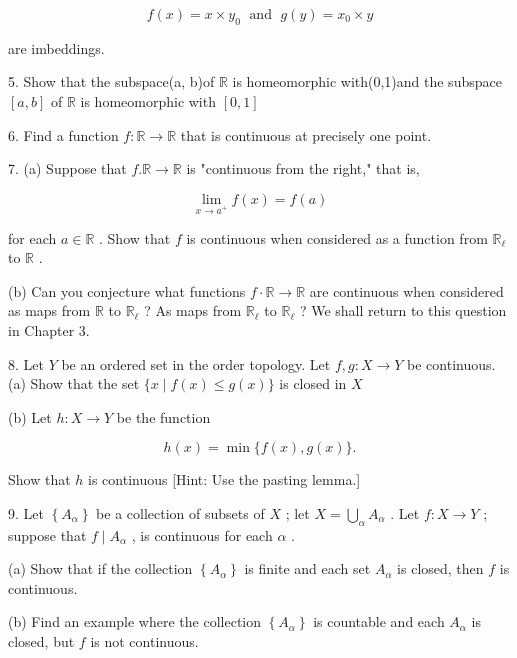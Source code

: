 \[
f\left( x\right)  = x \times  {y}_{0}\;\text{ and }\;g\left( y\right)  = {x}_{0} \times  y
\]

are imbeddings.

5. Show that the subspace(a, b)of \(\mathbb{R}\) is homeomorphic with(0,1)and the subspace \(\left\lbrack  {a,b}\right\rbrack\) of \(\mathbb{R}\) is homeomorphic with \(\left\lbrack  {0,1}\right\rbrack\)

6. Find a function \(f : \mathbb{R} \rightarrow  \mathbb{R}\) that is continuous at precisely one point.

7. (a) Suppose that \(f.\mathbb{R} \rightarrow  \mathbb{R}\) is "continuous from the right," that is,

\[
\mathop{\lim }\limits_{{x \rightarrow  {a}^{ + }}}f\left( x\right)  = f\left( a\right)
\]

for each \(a \in  \mathbb{R}\) . Show that \(f\) is continuous when considered as a function from \({\mathbb{R}}_{\ell }\) to \(\mathbb{R}\) .

(b) Can you conjecture what functions \(f \cdot  \mathbb{R} \rightarrow  \mathbb{R}\) are continuous when considered as maps from \(\mathbb{R}\) to \({\mathbb{R}}_{\ell }\) ? As maps from \({\mathbb{R}}_{\ell }\) to \({\mathbb{R}}_{\ell }\) ? We shall return to this question in Chapter 3.

8. Let \(Y\) be an ordered set in the order topology. Let \(f,g : X \rightarrow  Y\) be continuous. (a) Show that the set \(\{ x \mid  f\left( x\right)  \leq  g\left( x\right) \}\) is closed in \(X\)

(b) Let \(h : X \rightarrow  Y\) be the function

\[
h\left( x\right)  = \min \{ f\left( x\right) ,g\left( x\right) \} .
\]

Show that \(h\) is continuous [Hint: Use the pasting lemma.]

9. Let \(\left\{  {A}_{\alpha }\right\}\) be a collection of subsets of \(X\) ; let \(X = \mathop{\bigcup }\limits_{\alpha }{A}_{\alpha }\) . Let \(f : X \rightarrow  Y\) ; suppose that \(f \mid  {A}_{\alpha }\) , is continuous for each \(\alpha\) .

(a) Show that if the collection \(\left\{  {A}_{\alpha }\right\}\) is finite and each set \({A}_{\alpha }\) is closed, then \(f\) is continuous.

(b) Find an example where the collection \(\left\{  {A}_{\alpha }\right\}\) is countable and each \({A}_{\alpha }\) is closed, but \(f\) is not continuous.

